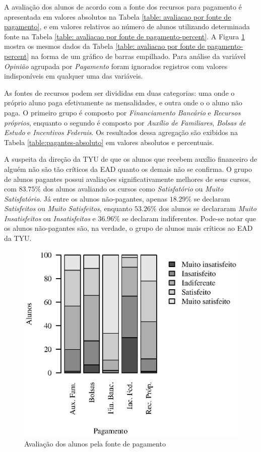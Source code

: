 \documentclass[10pt,a4paper,oneside]{article}
\begin{document}
A avaliação dos alunos de acordo com a fonte dos recursos para pagamento é apresentada em valores absolutos na Tabela \ref{table: avaliacao por fonte de pagamento}, e em valores relativos ao número de alunos utilizando determinada fonte na Tabela \ref{table: avaliacao por fonte de pagamento-percent}. A Figura \ref{figure: avaliacao por fonte de pagamento} mostra os mesmos dados da Tabela \ref{table: avaliacao por fonte de pagamento-percent} na forma de um gráfico de barras empilhado. Para análise da variável \textit{Opinião} agrupada por \textit{Pagamento} foram ignorados registros com valores indisponíveis em qualquer uma das variáveis. 

As fontes de recursos podem ser divididas em duas categorias: uma onde o próprio aluno paga efetivamente as mensalidades, e outra onde o o aluno não paga. O primeiro grupo é composto por \textit{Financiamento Bancário} e \textit{Recursos próprios}, enquanto o segundo é composto por \textit{Auxílio de Familiares}, \textit{Bolsas de Estudo} e \textit{Incentivos Federais}. Os resultados dessa agregação são exibidos na Tabela \ref{table:pagantes-absoluto} em valores absolutos e percentuais.

A suspeita da direção da TYU de que os alunos que recebem auxílio financeiro de alguém não são tão críticos da EAD quanto os demais não se confirma. O grupo de alunos pagantes possui avaliações significativamente melhores de seus cursos, com $83.75\%$ dos alunos avaliando os cursos como \textit{Satisfatório} ou \textit{Muito Satisfatório}. Já entre os alunos não-pagantes, apenas $18.29\%$ se declaram \textit{Satisfeitos} ou \textit{Muito Satisfeitos}, enquanto $53.26\%$ dos alunos se declararam \textit{Muito Insatisfeitos} ou \textit{Insatisfeitos} e $36.96\%$ se declaram indiferentes. Pode-se notar que os alunos não-pagantes são, na verdade, o grupo de alunos mais críticos ao EAD da TYU.

\begin{figure}[h]
	\centering
	\includegraphics[width=0.80\linewidth]{plots/stacked_opiniao_por_pagamento.eps}
	\caption{Avaliação dos alunos pela fonte de pagamento}
	\label{figure: avaliacao por fonte de pagamento}
\end{figure}
\end{document}
